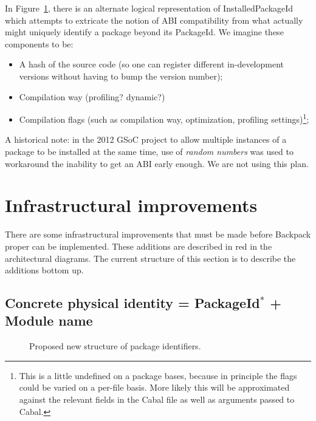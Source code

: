 \documentclass{article}
\begin{document}
In Figure~\ref{fig:proposed-pkgid}, there is an alternate logical
representation of InstalledPackageId which attempts to extricate the
notion of ABI compatibility from what actually might uniquely identify a
package beyond its PackageId.  We imagine these components to be:

\begin{itemize}
    \item A hash of the source code (so one can register different
        in-development versions without having to bump the version
        number);
    \item Compilation way (profiling? dynamic?)
    \item Compilation flags (such as compilation way, optimization,
        profiling settings)\footnote{This is a little undefined on a package bases, because in principle the flags could be varied on a per-file basis. More likely this will be approximated against the relevant fields in the Cabal file as well as arguments passed to Cabal.};
\end{itemize}

A historical note: in the 2012 GSoC project to allow multiple instances
of a package to be installed at the same time, use of \emph{random
numbers} was used to workaround the inability to get an ABI early
enough.  We are not using this plan.

\section{Infrastructural improvements}

There are some infrastructural improvements that must be made before
Backpack proper can be implemented.  These additions are described in
red in the architectural diagrams.  The current structure of this
section is to describe the additions bottom up.

\subsection{Concrete physical identity = PackageId$^*$ + Module name}\label{sec:ipi}

\begin{figure}
\label{fig:proposed-pkgid}\caption{Proposed new structure of package identifiers.}
\end{figure}
\end{document}
